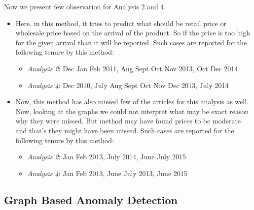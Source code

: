 \documentclass[a4paper,10pt]{report}
\begin{document}
		
		Now we present few observation for Analysis 2 and 4.
		
		
		\begin{itemize}
			\item Here, in this method, it tries to predict what should be retail price or wholesale price based on the arrival of the product. So if the price is too high for the given arrival than it will be reported.
			Such cases are reported for the following tenure by this method:
			\begin{itemize}
				\item \textit{Analysis 2}: Dec Jan Feb 2011, Aug Sept Oct Nov 2013, Oct Dec 2014
				\item \textit{Analysis 4}: Dec 2010, July Aug Sept Oct Nov Dec 2013, July 2014
			\end{itemize}
			
			\item Now, this method has also missed few of the articles for this analysis as well. Now, looking at the graphs we could not interpret what may be exact reason why they were missed. But method may have found prices to be moderate and that's they might have been missed.
			Such cases are reported for the following tenure by this method:
			\begin{itemize}
				\item \textit{Analysis 2}: Jan Feb 2013, July 2014, June July 2015
				\item \textit{Analysis 4}: Jan Feb 2013, June July 2013, June 2015
			\end{itemize}
		\end{itemize}
		
\subsection{Graph Based Anomaly Detection}
\end{document}
